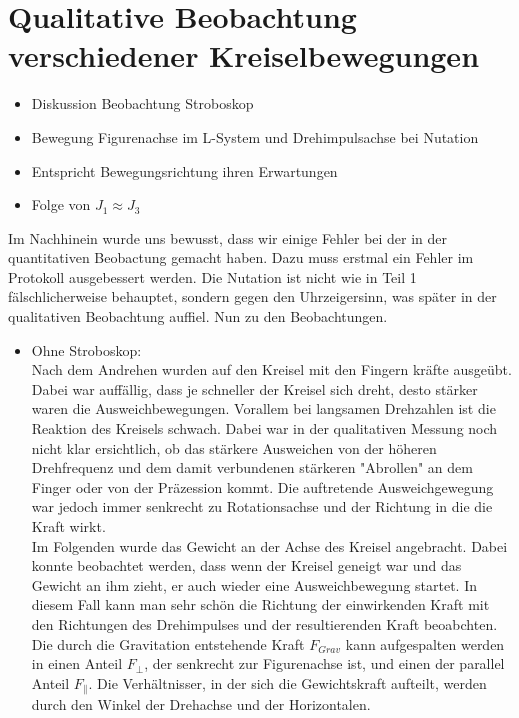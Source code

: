 

\section{Qualitative Beobachtung verschiedener Kreiselbewegungen}

\begin{itemize}
    \item Diskussion Beobachtung Stroboskop
    \item Bewegung Figurenachse im L-System und Drehimpulsachse bei Nutation
    \item Entspricht Bewegungsrichtung ihren Erwartungen
    \item Folge von $J_1 \approx J_3$
\end{itemize}

Im Nachhinein wurde uns bewusst, dass wir einige Fehler bei der in der quantitativen Beobactung gemacht haben. 
Dazu muss erstmal ein Fehler im Protokoll ausgebessert werden. Die Nutation ist nicht wie in Teil 1 fälschlicherweise 
behauptet, sondern gegen den Uhrzeigersinn, was später in der qualitativen Beobachtung auffiel. Nun zu den Beobachtungen.
\begin{itemize}
    \item Ohne Stroboskop:\\
    Nach dem Andrehen wurden auf den Kreisel mit den Fingern kräfte ausgeübt. Dabei war auffällig, dass je schneller der Kreisel sich dreht, desto stärker waren die Ausweichbewegungen.
    Vorallem bei langsamen Drehzahlen ist die Reaktion des Kreisels schwach. Dabei war in der qualitativen Messung noch nicht klar ersichtlich, ob das stärkere Ausweichen 
    von der höheren Drehfrequenz und dem damit verbundenen stärkeren "Abrollen" an dem Finger oder von der Präzession kommt. Die auftretende Ausweichgewegung war jedoch immer 
    senkrecht zu Rotationsachse und der Richtung in die die Kraft wirkt. \\
    Im Folgenden wurde das Gewicht an der Achse des Kreisel angebracht. Dabei konnte beobachtet werden, dass wenn der Kreisel geneigt war und das Gewicht an ihm zieht, er auch wieder 
    eine Ausweichbewegung startet. In diesem Fall kann man sehr schön die Richtung der einwirkenden Kraft mit den Richtungen des Drehimpulses und der resultierenden Kraft beoabchten.
    Die durch die Gravitation entstehende Kraft $F_{Grav}$ kann aufgespalten werden in einen Anteil $F_{\bot}$, der senkrecht zur Figurenachse ist, und einen der parallel Anteil $F_{\| }$. 
    Die Verhältnisser, in der sich die Gewichtskraft aufteilt, werden durch den Winkel der Drehachse und der Horizontalen.

\end{itemize}
